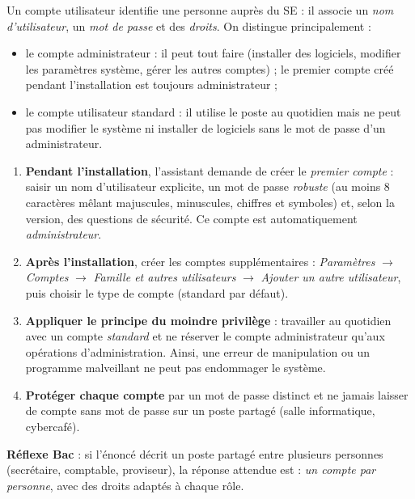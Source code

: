 \documentclass[11pt]{article}
\newcommand{\cle}[1]{{\popxbold\color{popdark}#1}}
\begin{document}
\begin{definition}
Un \cle{compte utilisateur} identifie une personne auprès du SE : il associe un \emph{nom d'utilisateur}, un \emph{mot de passe} et des \emph{droits}. On distingue principalement :
\begin{itemize}
\item le compte \cle{administrateur} : il peut tout faire (installer des logiciels, modifier les paramètres système, gérer les autres comptes) ; le premier compte créé pendant l'installation est toujours administrateur ;
\item le compte \cle{utilisateur standard} : il utilise le poste au quotidien mais ne peut pas modifier le système ni installer de logiciels sans le mot de passe d'un administrateur.
\end{itemize}
\end{definition}

\begin{methode}
\begin{enumerate}
\item \textbf{Pendant l'installation}, l'assistant demande de créer le \emph{premier compte} : saisir un nom d'utilisateur explicite, un mot de passe \emph{robuste} (au moins 8 caractères mêlant majuscules, minuscules, chiffres et symboles) et, selon la version, des questions de sécurité. Ce compte est automatiquement \emph{administrateur}.
\item \textbf{Après l'installation}, créer les comptes supplémentaires : \emph{Paramètres} $\to$ \emph{Comptes} $\to$ \emph{Famille et autres utilisateurs} $\to$ \emph{Ajouter un autre utilisateur}, puis choisir le type de compte (standard par défaut).
\item \textbf{Appliquer le principe du moindre privilège} : travailler au quotidien avec un compte \emph{standard} et ne réserver le compte administrateur qu'aux opérations d'administration. Ainsi, une erreur de manipulation ou un programme malveillant ne peut pas endommager le système.
\item \textbf{Protéger chaque compte} par un mot de passe distinct et ne jamais laisser de compte sans mot de passe sur un poste partagé (salle informatique, cybercafé).
\end{enumerate}
\textbf{Réflexe Bac} : si l'énoncé décrit un poste partagé entre plusieurs personnes (secrétaire, comptable, proviseur), la réponse attendue est : \emph{un compte par personne}, avec des droits adaptés à chaque rôle.
\end{methode}
\end{document}
